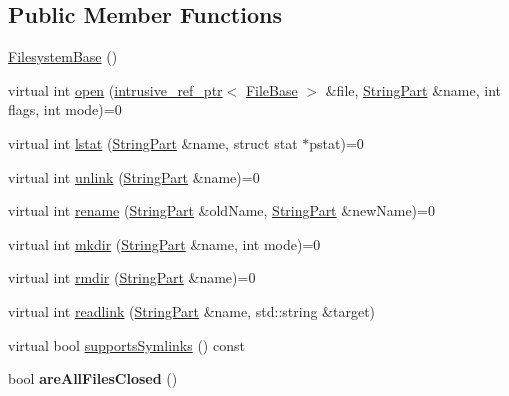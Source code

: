 \subsection*{Public Member Functions}
\begin{DoxyCompactItemize}
\item 
\hyperlink{classmiosix_1_1_filesystem_base_a47506f99792ce1b28cb34518f42982d6}{Filesystem\-Base} ()
\item 
virtual int \hyperlink{classmiosix_1_1_filesystem_base_ab593a305da9f37233d125835ed7dda60}{open} (\hyperlink{classmiosix_1_1intrusive__ref__ptr}{intrusive\-\_\-ref\-\_\-ptr}$<$ \hyperlink{classmiosix_1_1_file_base}{File\-Base} $>$ \&file, \hyperlink{classmiosix_1_1_string_part}{String\-Part} \&name, int flags, int mode)=0
\item 
virtual int \hyperlink{classmiosix_1_1_filesystem_base_a505e54a95daa86fa7219518b69159ba7}{lstat} (\hyperlink{classmiosix_1_1_string_part}{String\-Part} \&name, struct stat $\ast$pstat)=0
\item 
virtual int \hyperlink{classmiosix_1_1_filesystem_base_a465d109102a95aced48265cd506e3368}{unlink} (\hyperlink{classmiosix_1_1_string_part}{String\-Part} \&name)=0
\item 
virtual int \hyperlink{classmiosix_1_1_filesystem_base_a462c0615135088ad23d133a0b21f6c42}{rename} (\hyperlink{classmiosix_1_1_string_part}{String\-Part} \&old\-Name, \hyperlink{classmiosix_1_1_string_part}{String\-Part} \&new\-Name)=0
\item 
virtual int \hyperlink{classmiosix_1_1_filesystem_base_a475ecc9a46c125d27187ec1b1dc4b8ba}{mkdir} (\hyperlink{classmiosix_1_1_string_part}{String\-Part} \&name, int mode)=0
\item 
virtual int \hyperlink{classmiosix_1_1_filesystem_base_a061bac84c7f5f18e1efc6b938ebc0d66}{rmdir} (\hyperlink{classmiosix_1_1_string_part}{String\-Part} \&name)=0
\item 
virtual int \hyperlink{classmiosix_1_1_filesystem_base_a932012bd05958cef730ebb26970b791b}{readlink} (\hyperlink{classmiosix_1_1_string_part}{String\-Part} \&name, std\-::string \&target)
\item 
virtual bool \hyperlink{classmiosix_1_1_filesystem_base_a0e6f164ff15a418572f7bcc3c0a6bdd5}{supports\-Symlinks} () const 
\item 
\hypertarget{classmiosix_1_1_filesystem_base_a8d4650a784d18f7b719eb69e38dda517}{bool {\bfseries are\-All\-Files\-Closed} ()}\label{classmiosix_1_1_filesystem_base_a8d4650a784d18f7b719eb69e38dda517}


\end{DoxyCompactItemize}

